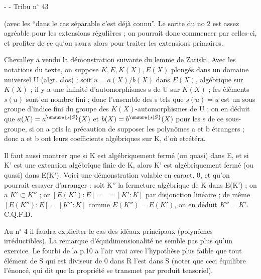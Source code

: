 -  -
Tribu n$^\circ$ 43

(avec les ``dans le cas séparable c'est déjà connu''. Le sorite du no 2 est assez agréable pour les extensions régulières ; on pourrait donc commencer par celles-ci, et profiter de ce qu'on saura alors pour traiter les extensions primaires.

Chevalley a vendu la démonstration suivante du \uline{lemme de Zariski}. Avec les notations du texte, on suppose $K,E,K(X),E(X)$ plongés dans un domaine universel U (algt. clos) ; soit $u=a(X)/b(X)$ dans $E(X)$, algébrique sur $K(X)$ ; il y a une infinité d'automorphismes s de U sur $K(X)$ ; les éléments $s(u)$ sont en nombre fini ; donc l'ensemble des s tels que $s(u)=u$ est un sous groupe d'indice fini du groupe des $K(X)$-automorphismes de U ; on en déduit que $a(X)=a^{\unsure{s|S}}(X)$ et $b(X)=b^{\unsure{s|S}}(X)$ pour les s de ce sous-groupe, si on a pris la précaution de supposer les polynômes a et b étrangers ; donc a et b ont leurs coefficients algébriques sur K, d'où etcétéra.

Il faut aussi montrer que si K est algébriquement fermé (ou quasi) dans E, et si K' est une extension algébrique finie de K, alors K' est algébriquement fermé (ou quasi) dans E(K'). Voici une démonstration valable en caract. 0, et qu'on pourrait essayer d'arranger : soit K'' la fermeture algébrique de K dans E(K') ; on a $K'\subset K''$ ; or $[E(K'):E]=$ $=[K':K]$ par disjonction linéaire ; de même $[E(K''):E]=[K'':K]$ comme $E(K'')=E(K')$, on en déduit $K''=K'$. C.Q.F.D.

Au n$^\circ$ 4 il faudra expliciter le cas des idéaux principaux (polynômes irréductibles). La remarque d'équidimensionalité ne semble pas plus qu'un exercice. Le fourbi de la p.10 a l'air vrai avec l'hypothèse plus faible que tout élément de S qui est diviseur de 0 dans R l'est dans S (noter que ceci équilibre l'énoncé, qui dit que la propriété se transmet par produit tensoriel).

